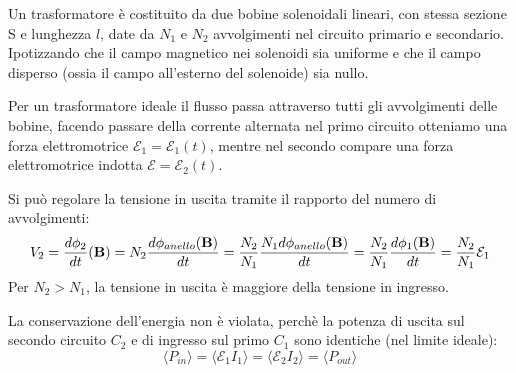 Un trasformatore \`e costituito da due bobine solenoidali lineari, con stessa sezione S e lunghezza $l$, date da $N_1$ e $N_2$ avvolgimenti nel circuito primario e secondario. Ipotizzando che il campo magnetico nei solenoidi sia uniforme e che il campo disperso (ossia il campo all'esterno del solenoide) sia nullo. 
\newline

Per un trasformatore ideale il flusso passa attraverso tutti gli avvolgimenti delle bobine, facendo passare della corrente alternata nel primo circuito otteniamo una forza elettromotrice $\mathcal{E}_1 = \mathcal{E}_1(t)$, mentre nel secondo compare una forza elettromotrice indotta $\mathcal{E} = \mathcal{E}_2(t)$.

Si pu\`o regolare la tensione in uscita tramite il rapporto del numero di avvolgimenti:
\begin{equation*}
	V_2 = \frac{d\phi_2}{dt}(\bold{B}) = N_2 \frac{d \phi_{anello}(\bold{B})}{dt} = \frac{N_2}{N_1} \frac{N_1d \phi_{anello}(\bold{B})}{dt} = \frac{N_2}{N_1} \frac{d \phi_1(\bold{B})}{dt} = \frac{N_2}{N_1} \mathcal{E}_1
\end{equation*}
Per $N_2 > N_1$, la tensione in uscita \`e maggiore della tensione in ingresso. 

La conservazione dell'energia non \`e violata, perch\`e la potenza di uscita sul secondo circuito $C_2$  e di ingresso sul primo $C_1$ sono identiche (nel limite ideale):
\begin{equation*}
	\langle P_{in} \rangle = \langle \mathcal{E}_1 I_1 \rangle = \langle \mathcal{E}_2 I_2 \rangle = \langle P_{out} \rangle 
\end{equation*}

